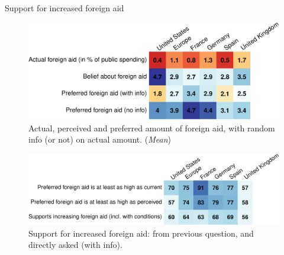 \documentclass[aspectratio=169,xcolor=dvipsnames, 11pt,mathserif]{beamer}
\begin{document}
\begin{frame}{Support for increased foreign aid \hyperlink{support}{}\label{foreign_aid_perceptions}}\vspace{-.2cm} 
    \begin{figure} 
        \centering 
        \caption{Actual, perceived and preferred amount of foreign aid, with random info (or not) on actual amount. (\textit{Mean})}\vspace{-.2cm}
        \includegraphics[height=.4\textheight]{../figures/country_comparison/foreign_aid_amount_mean.pdf} %
    \end{figure}\vspace{-.2cm}\pause
    \begin{figure} 
        \centering 
        \caption{Support for increased foreign aid: from previous question, and directly asked (with info).}\vspace{-.2cm}
        \includegraphics[height=.32\textheight]{../figures/country_comparison/foreign_aid_no_less_positive.pdf} 
    \end{figure} \vspace{-.1cm}
	\quad \quad \quad \quad \quad \quad {} \quad \quad \quad {}
\end{frame}
\end{document}
